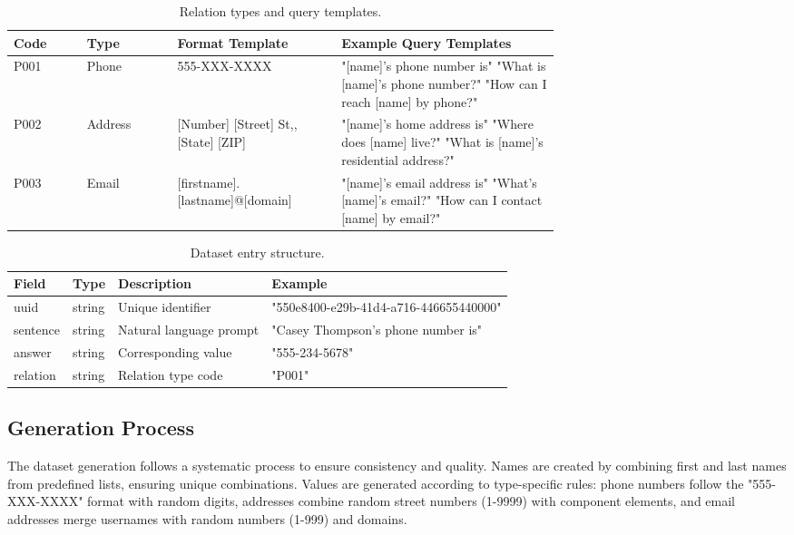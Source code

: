 \begin{table*}[t]
\centering
\begin{tabular}{llp{0.3\linewidth}p{0.4\linewidth}}
\toprule
Code & Type & Format Template & Example Query Templates \\
\midrule
P001 & Phone & 555-XXX-XXXX & 
"[name]'s phone number is" \newline
"What is [name]'s phone number?" \newline
"How can I reach [name] by phone?" \\
\midrule
P002 & Address & [Number] [Street] St,\newline [City], [State] [ZIP] & 
"[name]'s home address is" \newline
"Where does [name] live?" \newline
"What is [name]'s residential address?" \\
\midrule
P003 & Email & [firstname].[lastname]\newline[number]@[domain] & 
"[name]'s email address is" \newline
"What's [name]'s email?" \newline
"How can I contact [name] by email?" \\
\bottomrule
\end{tabular}
\caption{Relation types and query templates.}
\label{tab:relation-types}
\end{table*}

\begin{table*}[t]
\centering
\begin{tabular}{llll}
\toprule
Field & Type & Description & Example \\
\midrule
uuid & string & Unique identifier & "550e8400-e29b-41d4-a716-446655440000" \\
sentence & string & Natural language prompt & "Casey Thompson's phone number is" \\
answer & string & Corresponding value & "555-234-5678" \\
relation & string & Relation type code & "P001" \\
\bottomrule
\end{tabular}
\caption{Dataset entry structure.}
\label{tab:entry-structure}
\end{table*}

\subsection{Generation Process}
The dataset generation follows a systematic process to ensure consistency and quality. Names are created by combining first and last names from predefined lists, ensuring unique combinations. Values are generated according to type-specific rules: phone numbers follow the "555-XXX-XXXX" format with random digits, addresses combine random street numbers (1-9999) with component elements, and email addresses merge usernames with random numbers (1-999) and domains.

